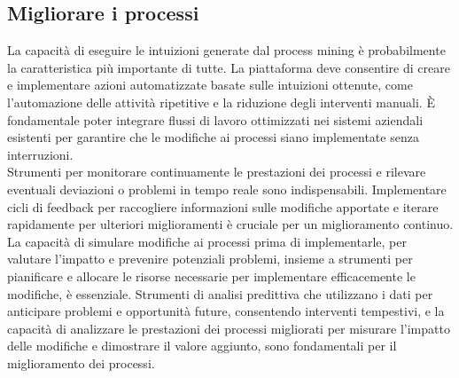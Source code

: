 \documentclass{article}
\begin{document}
\subsection{Migliorare i processi}
La capacità di eseguire le intuizioni generate dal process mining è probabilmente la caratteristica più importante di tutte. La piattaforma deve consentire di creare e implementare azioni automatizzate basate sulle intuizioni ottenute, come l'automazione delle attività ripetitive e la riduzione degli interventi manuali. È fondamentale poter integrare flussi di lavoro ottimizzati nei sistemi aziendali esistenti per garantire che le modifiche ai processi siano implementate senza interruzioni.\\
Strumenti per monitorare continuamente le prestazioni dei processi e rilevare eventuali deviazioni o problemi in tempo reale sono indispensabili. Implementare cicli di feedback per raccogliere informazioni sulle modifiche apportate e iterare rapidamente per ulteriori miglioramenti è cruciale per un miglioramento continuo.\\
La capacità di simulare modifiche ai processi prima di implementarle, per valutare l'impatto e prevenire potenziali problemi, insieme a strumenti per pianificare e allocare le risorse necessarie per implementare efficacemente le modifiche, è essenziale. Strumenti di analisi predittiva che utilizzano i dati per anticipare problemi e opportunità future, consentendo interventi tempestivi, e la capacità di analizzare le prestazioni dei processi migliorati per misurare l'impatto delle modifiche e dimostrare il valore aggiunto, sono fondamentali per il miglioramento dei processi.
\end{document}
